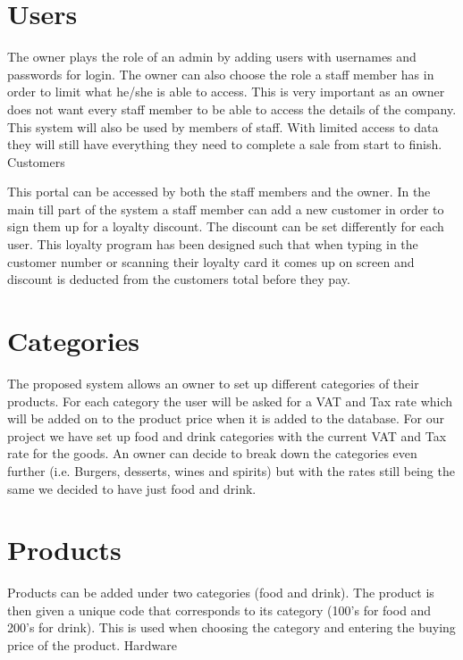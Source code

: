 \section{Users}

The owner plays the role of an admin by adding users with usernames and passwords for login. The owner can also choose the role a staff member has in order to limit what he/she is able to access. This is very important as an owner does not want every staff member to be able to access the details of the company.
\newline
\newline
This system will also be used by members of staff. With limited access to data they will still have everything they need to complete a sale from start to finish.
Customers

This portal can be accessed by both the staff members and the owner. In the main till part of the system a staff member can add a new customer in order to sign them up for a loyalty discount. The discount can be set differently for each user. This loyalty program has been designed such that when typing in the customer number or scanning their loyalty card it comes up on screen and discount is deducted from the customers total before they pay.

\section{Categories}

The proposed system allows an owner to set up different categories of their products. For each category the user will be asked for a VAT and Tax rate which will be added on to the product price when it is added to the database. For our project we have set up food and drink categories with the current VAT and Tax rate for the goods. An owner can decide to break down the categories even further (i.e. Burgers, desserts, wines and spirits) but with the rates still being the same we decided to have just food and drink.

\section{Products}

Products can be added under two categories (food and drink). The product is then given a unique code that corresponds to its category (100’s for food and 200’s for drink). This is used when choosing the category and entering the buying price of the product.
Hardware









